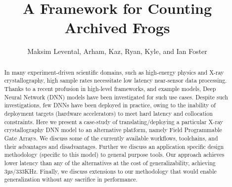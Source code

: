 \documentclass[sigconf,techreport]{acmart}
\begin{document}
\title{A Framework for Counting Archived Frogs}

\author{Maksim Levental, Arham, Kaz, Ryan, Kyle, and Ian Foster}

\renewcommand{\shortauthors}{Levental et al.}


\begin{abstract}
	In many experiment-driven scientific domains, such as high-energy physics and X-ray crystallography, high sample rates necessitate low latency near-sensor data processing.
	Thanks to a recent profusion in high-level frameworks, and example models, Deep Neural Network (DNN) models have been investigated for such use cases.
	Despite such investigations, few DNNs have been deployed in practice, owing to the inability of deployment targets (hardware accelerators) to meet hard latency and collocation constraints.
	Here we present a case-study of translating/deploying a particular X-ray crystallography DNN model to an alternative platform, namely Field Programmable Gate Arrays.
	We discuss some of the currently available workflows, toolchains, and their advantages and disadvantages.
	Further we discuss an application specific design methodology (specific to this model) to general purpose tools.
	Our approach achieves lower latency than any of the alternatives at the cost of generalizability, achieving 3µs/333KHz.
	Finally, we discuss extensions to our methodology that would enable generalization without any sacrifice in performance.
\end{abstract}



\end{document}
